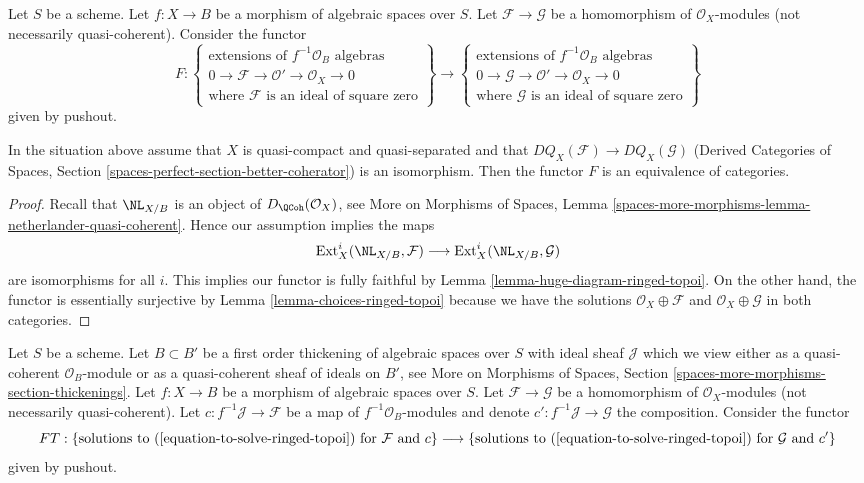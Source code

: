 \noindent
Let $S$ be a scheme. Let $f : X \to B$
be a morphism of algebraic spaces over $S$.
Let $\mathcal{F} \to \mathcal{G}$ be a homomorphism of $\mathcal{O}_X$-modules
(not necessarily quasi-coherent).
Consider the functor
$$
F :
\left\{
\begin{matrix}
\text{extensions of }f^{-1}\mathcal{O}_B\text{ algebras}\\
0 \to \mathcal{F} \to \mathcal{O}' \to \mathcal{O}_X \to 0\\
\text{where }\mathcal{F}\text{ is an ideal of square zero}
\end{matrix}
\right\}
\longrightarrow
\left\{
\begin{matrix}
\text{extensions of }f^{-1}\mathcal{O}_B\text{ algebras}\\
0 \to \mathcal{G} \to \mathcal{O}' \to \mathcal{O}_X \to 0\\
\text{where }\mathcal{G}\text{ is an ideal of square zero}
\end{matrix}
\right\}
$$
given by pushout.

\begin{lemma}
\label{lemma-thickening-space-quasi-coherent}
In the situation above assume that $X$ is quasi-compact and quasi-separated
and that $DQ_X(\mathcal{F}) \to DQ_X(\mathcal{G})$
(Derived Categories of Spaces, Section
\ref{spaces-perfect-section-better-coherator})
is an isomorphism. Then the functor $F$ is an equivalence of categories.
\end{lemma}

\begin{proof}
Recall that $\NL_{X/B}$ is an object of $D_\QCoh(\mathcal{O}_X)$, see
More on Morphisms of Spaces, Lemma
\ref{spaces-more-morphisms-lemma-netherlander-quasi-coherent}.
Hence our assumption implies the maps
$$
\text{Ext}^i_X(\NL_{X/B}, \mathcal{F}) \longrightarrow
\text{Ext}^i_X(\NL_{X/B}, \mathcal{G})
$$
are isomorphisms for all $i$. This implies our functor is fully
faithful by Lemma \ref{lemma-huge-diagram-ringed-topoi}.
On the other hand, the functor is essentially surjective by
Lemma \ref{lemma-choices-ringed-topoi} because
we have the solutions $\mathcal{O}_X \oplus \mathcal{F}$
and $\mathcal{O}_X \oplus \mathcal{G}$ in both categories.
\end{proof}

\noindent
Let $S$ be a scheme. Let $B \subset B'$ be a first order thickening of
algebraic spaces over $S$ with ideal sheaf $\mathcal{J}$
which we view either as a quasi-coherent $\mathcal{O}_B$-module
or as a quasi-coherent sheaf of ideals on $B'$, see
More on Morphisms of Spaces, Section
\ref{spaces-more-morphisms-section-thickenings}.
Let $f : X \to B$ be a morphism of algebraic spaces over $S$.
Let $\mathcal{F} \to \mathcal{G}$ be a homomorphism of
$\mathcal{O}_X$-modules (not necessarily quasi-coherent).
Let $c : f^{-1}\mathcal{J} \to \mathcal{F}$ be a map
of $f^{-1}\mathcal{O}_B$-modules and denote
$c' : f^{-1}\mathcal{J} \to \mathcal{G}$ the composition.
Consider the functor
$$
FT :
\{\text{solutions to }(\ref{equation-to-solve-ringed-topoi})
\text{ for }\mathcal{F}\text{ and }c\}
\longrightarrow
\{\text{solutions to }(\ref{equation-to-solve-ringed-topoi})
\text{ for }\mathcal{G}\text{ and }c'\}
$$
given by pushout.


